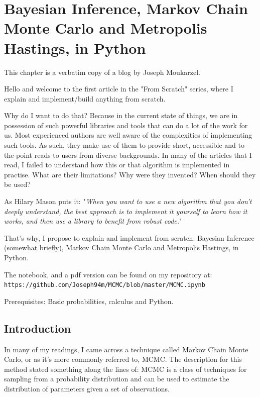 
\chapter{Bayesian Inference, Markov Chain Monte Carlo and Metropolis Hastings, in Python}
\label{chap:BayesianInferenceMCMCandMetropolisHastingsinPython}

This chapter is a verbatim copy of a blog \cite{JosephMoukarzel2018} by Joseph Moukarzel.

Hello and welcome to the first article in the "From Scratch" series, where I explain and implement/build anything from scratch.

Why do I want to do that? Because in the current state of things, we are in possession of such powerful libraries and tools that can do a lot of the work for us. Most experienced authors are well aware of the complexities of implementing such tools. As such, they make use of them to provide short, accessible and to-the-point reads to users from diverse backgrounds. In many of the articles that I read, I failed to understand how this or that algorithm is implemented in practise. What are their limitations? Why were they invented? When should they be used?

As Hilary Mason puts it:
"\textit{When you want to use a new algorithm that you don't deeply understand, the best approach is to implement it yourself to learn how it works, and then use a library to benefit from robust code.}"

That's why, I propose to explain and implement from scratch: Bayesian Inference (somewhat briefly), Markov Chain Monte Carlo and Metropolis Hastings, in Python.

The notebook, and a pdf version can be found on my repository at: \lstinline{https://github.com/Joseph94m/MCMC/blob/master/MCMC.ipynb}

Prerequisites: Basic probabilities, calculus and Python.

\section{Introduction}

In many of my readings, I came across a technique called Markov Chain Monte Carlo, or as it's more commonly referred to, MCMC. The description for this method stated something along the lines of: MCMC is a class of techniques for sampling from a probability distribution and can be used to estimate the distribution of parameters given a set of observations.


